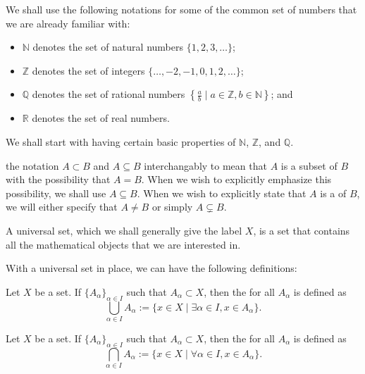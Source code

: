 \documentclass[notoc,notitlepage]{tufte-book}
\begin{document}
We shall use the following notations for some of the common set of numbers that we are already familiar with:
\begin{itemize}
  \item $\mathbb{N}$ denotes the set of natural numbers $\{1, 2, 3, \ldots\}$;
  \item $\mathbb{Z}$ denotes the set of integers $\{\ldots, -2, -1, 0, 1, 2, \ldots\}$;
  \item $\mathbb{Q}$ denotes the set of rational numbers $\left\{ \frac{a}{b} \mid a \in \mathbb{Z}, b \in \mathbb{N} \right\}$; and
  \item $\mathbb{R}$ denotes the set of real numbers.
\end{itemize}

We shall start with having certain basic properties of $\mathbb{N}$, $\mathbb{Z}$, and $\mathbb{Q}$.

 the notation $A \subset B$ and $A \subseteq B$ interchangably to mean that $A$ is a subset of $B$ with the possibility that $A = B$. When we wish to explicitly emphasize this possibility, we shall use $A \subseteq B$. When we wish to explicitly state that $A$ is a  of $B$, we will either specify that $A \neq B$ or simply $A \subsetneq B$.

\begin{defn}\label{defn:universal_set}
  A universal set, which we shall generally give the label $X$, is a set that contains all the mathematical objects that we are interested in.
\end{defn}

With a universal set in place, we can have the following definitions:

\begin{defn}[Union]\label{defn:union}
  Let $X$ be a set. If ${\{A_\alpha\}}_{\alpha \in I}$ such that $A_{\alpha} \subset X$, then the  for all $A_{\alpha}$ is defined as
  \begin{equation*}
    \bigcup_{\alpha \in I} A_{\alpha} := \{ x \in X \mid \exists \alpha \in I, x \in A_{\alpha} \}.
  \end{equation*}
\end{defn}

\begin{defn}[Intersection]\label{defn:intersection}
  Let $X$ be a set. If ${\{A_\alpha\}}_{\alpha \in I}$ such that $A_\alpha \subset X$, then the  for all $A_\alpha$ is defined as
  \begin{equation*}
    \bigcap_{\alpha \in I} A_\alpha := \{ x \in X \mid \forall \alpha \in I, x \in A_\alpha \}.
  \end{equation*}
\end{defn}
\end{document}
